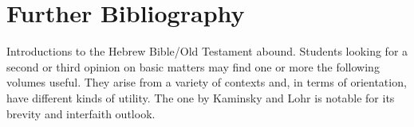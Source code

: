 \documentclass[titlepage]{article}
\newcommand\policy{../policy}
\begin{document}
%


\section{Further Bibliography}
\label{bib}

Introductions to the Hebrew Bible/Old Testament abound. Students looking
for a second or third opinion on basic matters may find one or more the
following volumes useful. They arise from a variety of contexts and, in
terms of orientation, have different kinds of utility. The one by
Kaminsky and Lohr \cite{hbfb} is notable for its brevity and interfaith
outlook.

\begingroup
\renewcommand{\section}[2]{}%
\end{document}

